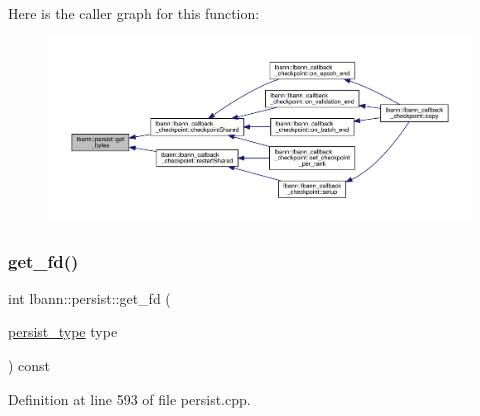 Here is the caller graph for this function\+:\nopagebreak
\begin{figure}[H]
\begin{center}
\leavevmode
\includegraphics[width=350pt]{classlbann_1_1persist_ad759657d69e88a491729ce8e4bf9510e_icgraph}
\end{center}
\end{figure}
\mbox{\label{classlbann_1_1persist_a0fe7bbf6a5a47417aa904d0cb64af3fd}} 
\subsubsection{\texorpdfstring{get\+\_\+fd()}{get\_fd()}}
{\footnotesize\ttfamily int lbann\+::persist\+::get\+\_\+fd (\begin{DoxyParamCaption}\item[{\hyperlink{namespacelbann_adee41f31f15f3906cbdcce4a1417eb56}{persist\+\_\+type}}]{type }\end{DoxyParamCaption}) const\hspace{0.3cm}{\ttfamily [private]}}



Definition at line 593 of file persist.\+cpp.



